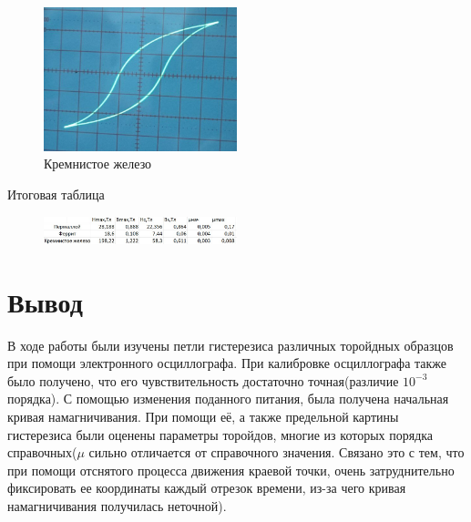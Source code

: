 \documentclass[a4paper,12pt]{article}
\begin{document}
\begin{figure}[H]
	\begin{center}
    \includegraphics[width=0.5\textwidth]{photogist3.jpg}
    \caption{Кремнистое железо}
\label{fig:foobar}
	\end{center}
\end{figure}

Итоговая таблица
\begin{figure}[H]
	\begin{center}
    \includegraphics[width=0.5\textwidth]{itog.jpg}
\label{fig:foobar}
	\end{center}
\end{figure}

\section{Вывод}
В ходе работы были изучены петли гистерезиса различных торойдных образцов при помощи электронного осциллографа. При калибровке осциллографа также было получено, что его чувствительность достаточно точная(различие $10^{-3}$ порядка). С помощью изменения поданного питания, была получена начальная кривая намагничивания. При помощи её, а также предельной картины гистерезиса были оценены параметры торойдов, многие из которых порядка справочных($\mu$ сильно отличается от справочного значения. Связано это с тем, что при помощи отснятого процесса движения краевой точки, очень затруднительно фиксировать ее координаты каждый отрезок времени, из-за чего кривая намагничивания получилась неточной).
\end{document}

